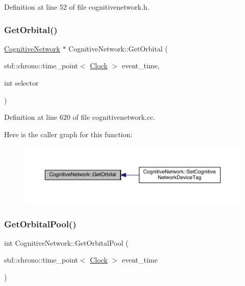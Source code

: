 Definition at line 52 of file cognitivenetwork.\+h.

\mbox{\label{class_cognitive_network_a69655ef1e12bac5f74c2eb85c72720f4}} 
\subsubsection{\texorpdfstring{Get\+Orbital()}{GetOrbital()}}
{\footnotesize\ttfamily \hyperlink{class_cognitive_network}{Cognitive\+Network} $\ast$ Cognitive\+Network\+::\+Get\+Orbital (\begin{DoxyParamCaption}\item[{std\+::chrono\+::time\+\_\+point$<$ \hyperlink{universe_8h_a0ef8d951d1ca5ab3cfaf7ab4c7a6fd80}{Clock} $>$}]{event\+\_\+time,  }\item[{int}]{selector }\end{DoxyParamCaption})}



Definition at line 620 of file cognitivenetwork.\+cc.

Here is the caller graph for this function\+:
\nopagebreak
\begin{figure}[H]
\begin{center}
\leavevmode
\includegraphics[width=350pt]{class_cognitive_network_a69655ef1e12bac5f74c2eb85c72720f4_icgraph}
\end{center}
\end{figure}
\mbox{\label{class_cognitive_network_af5995eaa4ba35c555a6b65d895451f25}} 
\subsubsection{\texorpdfstring{Get\+Orbital\+Pool()}{GetOrbitalPool()}}
{\footnotesize\ttfamily int Cognitive\+Network\+::\+Get\+Orbital\+Pool (\begin{DoxyParamCaption}\item[{std\+::chrono\+::time\+\_\+point$<$ \hyperlink{universe_8h_a0ef8d951d1ca5ab3cfaf7ab4c7a6fd80}{Clock} $>$}]{event\+\_\+time }\end{DoxyParamCaption})\hspace{0.3cm}{\ttfamily [inline]}}



